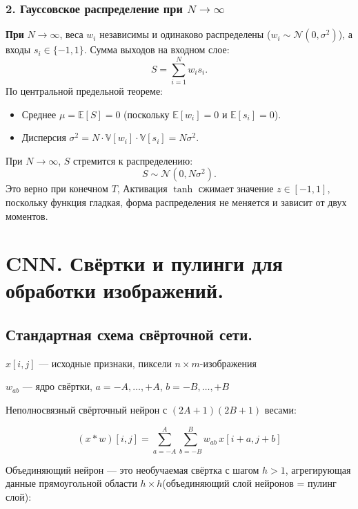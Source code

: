 \begin{description}
	      \subsubsection*{2. Гауссовское распределение при \( N \to \infty \)}

	      \textbf{При} \( N \to \infty \), веса \( w_i \) независимы и одинаково распределены (\( w_i \sim \mathcal{N}(0, \sigma^2) \)), а входы \( s_i \in \{-1, 1\} \).
	      Сумма выходов на входном слое:
	      \[
		      S = \sum_{i=1}^N w_i s_i.
	      \]
	      По центральной предельной теореме:
	      \begin{itemize}
		      \item Среднее \( \mu = \mathbb{E}[S] = 0 \) (поскольку \( \mathbb{E}[w_i] = 0 \) и \( \mathbb{E}[s_i] = 0 \)).
		      \item Дисперсия \( \sigma^2 = N \cdot \mathbb{V}[w_i] \cdot \mathbb{V}[s_i] = N \sigma^2 \).
	      \end{itemize}
	      При \( N \to \infty \), \( S \) стремится к распределению:
	      \[
		      S \sim \mathcal{N}(0, N \sigma^2).
	      \]
	      Это верно при конечном $T$, Активация
	      $\tanh$ сжимает значение $z \in [-1, 1]$, поскольку функция гладкая, форма распределения не меняется и зависит от двух моментов.


	      \section{CNN. Свёртки и пулинги для обработки изображений.}
	      \subsection{Стандартная схема свёрточной сети.}

	      $ x[i, j] $ — исходные признаки, пиксели $ n \times m $-изображения

	      $ w_{ab} $ — ядро свёртки, $ a = -A, \ldots, +A $, $ b = -B, \ldots, +B $

	      Неполносвязный свёрточный нейрон с $ (2A + 1)(2B + 1) $ весами:

	      $$
		      (x * w)[i, j] = \sum_{a=-A}^{A} \sum_{b=-B}^{B} w_{ab} \, x[i + a, j + b]
	      $$

	      Объединяющий нейрон — это необучаемая свёртка с шагом $ h > 1 $, агрегирующая данные прямоугольной области $ h \times h $(объединяющий слой нейронов = пулинг слой):


\end{description}
